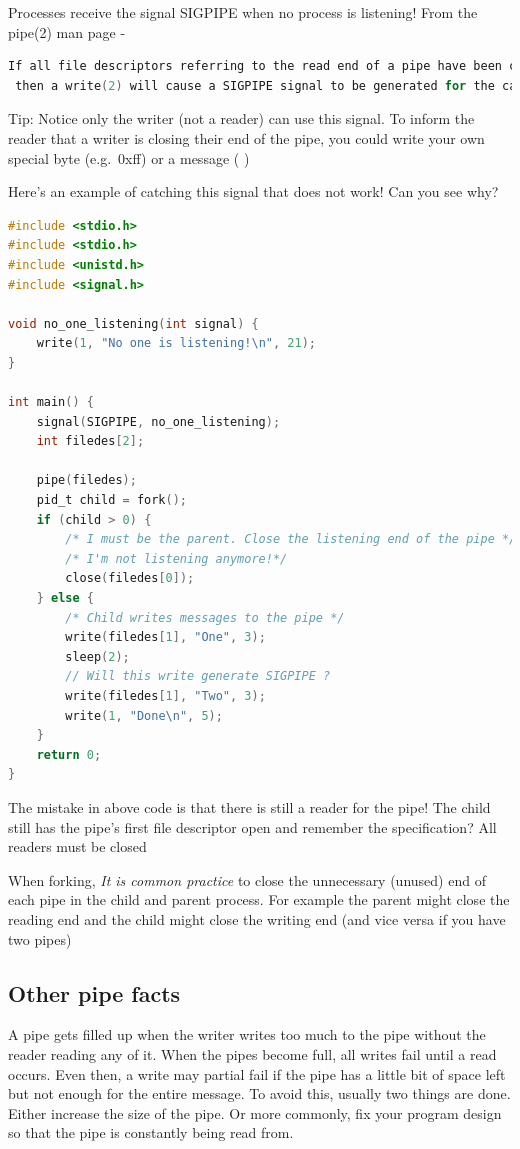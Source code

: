 Processes receive the signal SIGPIPE when no process is listening! From
the pipe(2) man page -

\begin{lstlisting}[language=C]
If all file descriptors referring to the read end of a pipe have been closed,
 then a write(2) will cause a SIGPIPE signal to be generated for the calling process. 
\end{lstlisting}

Tip: Notice only the writer (not a reader) can use this signal. To
inform the reader that a writer is closing their end of the pipe, you
could write your own special byte (e.g.~0xff) or a message (
)

Here's an example of catching this signal that does not work! Can you
see why?

\begin{lstlisting}[language=C]
#include <stdio.h>
#include <stdio.h>
#include <unistd.h>
#include <signal.h>

void no_one_listening(int signal) {
    write(1, "No one is listening!\n", 21);
}

int main() {
    signal(SIGPIPE, no_one_listening);
    int filedes[2];
    
    pipe(filedes);
    pid_t child = fork();
    if (child > 0) { 
        /* I must be the parent. Close the listening end of the pipe */
        /* I'm not listening anymore!*/
        close(filedes[0]);
    } else {
        /* Child writes messages to the pipe */
        write(filedes[1], "One", 3);
        sleep(2);
        // Will this write generate SIGPIPE ?
        write(filedes[1], "Two", 3);
        write(1, "Done\n", 5);
    }
    return 0;
}
\end{lstlisting}

The mistake in above code is that there is still a reader for the pipe! The child still has the pipe's first file descriptor open and remember the specification? All readers must be closed 

When forking, \emph{It is common practice} to close the unnecessary (unused) end of each pipe in the child and parent process. For example the parent might close the reading end and the child might close the writing end (and vice versa if you have two pipes)
\subsection{Other pipe facts}

A pipe gets filled up when the writer writes too much to the pipe without the reader reading any of it. When the pipes become full, all writes fail until a read occurs. Even then, a write may partial fail if the pipe has a little bit of space left but not enough for the entire message. To avoid this, usually two things are done. Either increase the size of the pipe. Or more commonly, fix your program design so that the pipe is constantly being read from.

